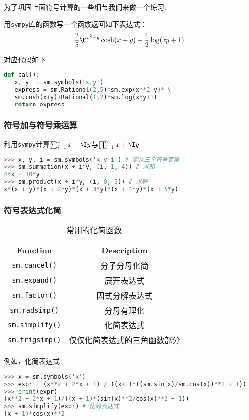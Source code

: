为了巩固上面符号计算的一些细节我们来做一个练习．
\begin{example}{}
用\verb|sympy|库的函数写一个函数返回如下表达式：
\begin{align}
\frac{2}{5}\E^{x^2-y}\cosh(x+y)+\frac{1}{2}\log(xy+1)
\end{align}


对应代码如下
\begin{lstlisting}[language=python]
def cal():
   x, y  = sm.symbols('x,y')
   express = sm.Rational(2,5)*sm.exp(x**2-y)* \
   sm.cosh(x+y)+Rational(1,2)*sm.log(x*y+1)
   return express
\end{lstlisting}
\end{example}

\subsubsection{符号加与符号乘运算}
利用\verb|sympy|计算$\sum_{i=1}^4{x+\I y}$与$\prod_{i=1}^5{x+\I y}$
\begin{lstlisting}[language=python]
>>> x, y, i = sm.symbols('x y i') # 定义三个符号变量
>>> sm.summation(x + i*y, (i, 1, 4)) # 求和
4*x + 10*y
>>> sm.product(x + i*y, (i, 0, 5)) # 求积
x*(x + y)*(x + 2*y)*(x + 3*y)*(x + 4*y)*(x + 5*y)
\end{lstlisting}

\subsubsection{符号表达式化简}
\begin{table}[ht]
\centering
\caption{常用的化简函数}\label{SymPy_tab1}
\begin{tabular}{c|c}
Function &Description \\
\hline
\verb|sm.cancel()| &分子分母化简 \\
\hline
\verb|sm.expand()| &展开表达式\\
\hline
\verb|sm.factor()| &因式分解表达式\\
\hline
\verb|sm.radsimp()| &分母有理化\\
\hline
\verb|sm.simplify()| &化简表达式\\
\hline
\verb|sm.trigsimp()| &仅仅化简表达式的三角函数部分\\
\hline
\end{tabular}
\end{table}

例如，化简表达式
\begin{lstlisting}[language=python]
>>> x = sm.symbols('x')
>>> expr = (x**2 + 2*x + 1) / ((x+1)*((sm.sin(x)/sm.cos(x))**2 + 1))
>>> print(expr)
(x**2 + 2*x + 1)/((x + 1)*(sin(x)**2/cos(x)**2 + 1))
>>> sm.simplify(expr) # 化简表达式
(x + 1)*cos(x)**2
\end{lstlisting}


